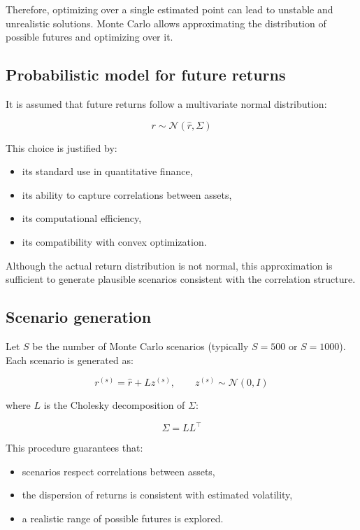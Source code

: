 \documentclass[12pt]{article}
\begin{document}
Therefore, optimizing over a single estimated point can lead to unstable and unrealistic solutions.  
Monte Carlo allows approximating the distribution of possible futures and optimizing over it.

\subsection{Probabilistic model for future returns}

It is assumed that future returns follow a multivariate normal distribution:



\[
r \sim \mathcal{N}(\hat{r}, \Sigma)
\]



This choice is justified by:

\begin{itemize}
    \item its standard use in quantitative finance,
    \item its ability to capture correlations between assets,
    \item its computational efficiency,
    \item its compatibility with convex optimization.
\end{itemize}

Although the actual return distribution is not normal, this approximation is sufficient to generate plausible scenarios consistent with the correlation structure.

\subsection{Scenario generation}

Let $S$ be the number of Monte Carlo scenarios (typically $S = 500$ or $S = 1000$).  
Each scenario is generated as:



\[
r^{(s)} = \hat{r} + L z^{(s)}, \qquad z^{(s)} \sim \mathcal{N}(0, I)
\]



where $L$ is the Cholesky decomposition of $\Sigma$:



\[
\Sigma = LL^\top
\]



This procedure guarantees that:

\begin{itemize}
    \item scenarios respect correlations between assets,
    \item the dispersion of returns is consistent with estimated volatility,
    \item a realistic range of possible futures is explored.
\end{itemize}
\end{document}
